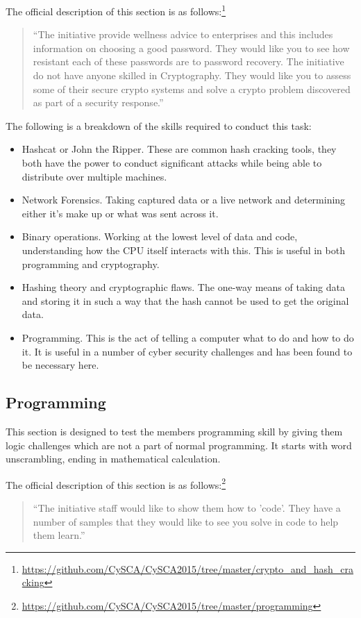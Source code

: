 \documentclass[a4paper,11pt]{report}
\begin{document}
			The official description of this section is as follows:\footnote{\url{https://github.com/CySCA/CySCA2015/tree/master/crypto\_and\_hash\_cracking}}
			\begin{quote}
				``The initiative provide wellness advice to enterprises and this includes information on choosing a good password. They would like you to see how resistant each of these passwords are to password recovery. The initiative do not have anyone skilled in Cryptography. They would like you to assess some of their secure crypto systems and solve a crypto problem discovered as part of a security response.''
			\end{quote}

			The following is a breakdown of the skills required to conduct this task:
			\begin{itemize}
				\item Hashcat or John the Ripper. 
					These are common hash cracking tools, they both have the power to conduct significant attacks while being able to distribute over multiple machines. 
				\item Network Forensics.
					Taking captured data or a live network and determining either it's make up or what was sent across it. 
				\item Binary operations. 
					Working at the lowest level of data and code, understanding how the CPU itself interacts with this. 
					This is useful in both programming and cryptography. 
				\item Hashing theory and cryptographic flaws.
					The one-way means of taking data and storing it in such a way that the hash cannot be used to get the original data. 
				\item Programming.
					This is the act of telling a computer what to do and how to do it. 
					It is useful in a number of cyber security challenges and has been found to be necessary here. 
			\end{itemize}

		\subsection{Programming}
			This section is designed to test the members programming skill by giving them logic challenges which are not a part of normal programming. 
			It starts with word unscrambling, ending in mathematical calculation. 
			
			The official description of this section is as follows:\footnote{\url{https://github.com/CySCA/CySCA2015/tree/master/programming}}
			\begin{quote}
				``The initiative staff would like to show them how to 'code'. They have a number of samples that they would like to see you solve in code to help them learn.''
			\end{quote}
\end{document}
